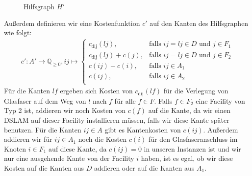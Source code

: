 \documentclass[11pt,a4paper]{article}
\newcommand{\Q}{\mathbb{Q}}
\theoremstyle{my_th_style1}
\begin{document}
\begin{figure}[h]
	\centering
{}
\caption{Hilfsgraph $H'$} \label{H''}
\end{figure}
Außerdem definieren wir eine Kostenfunktion $c'$ auf den Kanten des Hilfsgraphen wie folgt:
\begin{align}
\label{first_c_prime}
c': A' \rightarrow \Q_{\geq 0}, ij \mapsto \left\{\begin{array}{cl} 
c_{\text{dij}}(lj), & \text{falls } ij = lj \in D \text{ und } j \in F_1\\ 
c_{\text{dij}}(lj)+c(j), & \text{falls } ij = lj \in D \text{ und } j \in F_2\\ 
c(ij) + c(i), & \text{falls } ij \in A_1\\ 
c(ij), & \text{falls } ij \in A_2\\ 
\end{array}
\right.
\end{align}
Für die Kanten $lf$ ergeben sich Kosten von $c_{\text{dij}}(lf)$ für die Verlegung von Glasfaser auf dem Weg von $l$ nach $f$ für alle $f \in F$. Falls $f \in F_2$ eine Facility von Typ 2 ist, addieren wir noch Kosten von $c(f)$ auf die Kante, da wir einen DSLAM auf dieser Facility installieren m\"ussen, falls wir diese Kante sp\"ater benutzen. Für die Kanten $ij \in A$ gibt es Kantenkosten von $c(ij)$. Außerdem addieren wir für $ij \in A_1$ noch die Kosten \(c(i)\) für den Glasfaseranschluss im Knoten \(i \in F_1\) auf diese Kante, da $c(ij)=0$ in unseren Instanzen ist und wir nur eine ausgehende Kante von der Facility $i$ haben, ist es egal, ob wir diese Kosten auf die Kanten aus \(D\) addieren oder auf die Kanten aus \(A_1\).
\end{document}
